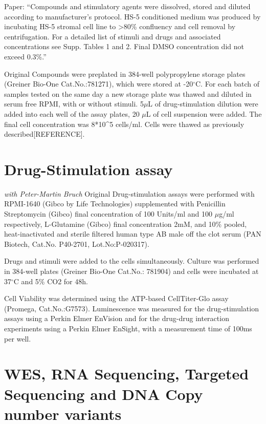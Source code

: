 \documentclass[11pt, a4paper, twosided]{book}
\begin{document}
Paper:
``Compounds and stimulatory agents were dissolved, stored and diluted according to manufacturer's protocol. HS-5 conditioned medium was produced by incubating HS-5 stromal cell line to \textgreater80\% confluency and cell removal by centrifugation. For a detailed list of stimuli and drugs and associated concentrations see Supp. Tables 1 and 2. Final DMSO concentration did not exceed 0.3\%.''

Original
Compounds were preplated in 384-well polypropylene storage plates (Greiner Bio-One Cat.No.:781271), which were stored at -20\(^\circ\)C. For each batch of samples tested on the same day a new storage plate was thawed and diluted in serum free RPMI, with or without stimuli. 5\(\mu\)L of drug-stimulation dilution were added into each well of the assay plates, 20 \(\mu\)L of cell suspension were added. The final cell concentration was 8*10\^{}5 cells/ml. Cells were thawed as previously described{[}REFERENCE{]}.

\hypertarget{drug-stimulation-assay}{%
\chapter{Drug-Stimulation assay}\label{drug-stimulation-assay}}

\emph{with Peter-Martin Bruch} Original
Drug-stimulation assays were performed with RPMI-1640 (Gibco by Life Technologies) supplemented with Penicillin Streptomycin (Gibco) final concentration of 100 Units/ml and 100 \(\mu\)g/ml respectively, L-Glutamine (Gibco) final concentration 2mM, and 10\% pooled, heat-inactivated and sterile filtered human type AB male off the clot serum (PAN Biotech, Cat.No. P40-2701, Lot.No:P-020317).

Drugs and stimuli were added to the cells simultaneously. Culture was performed in 384-well plates (Greiner Bio-One Cat.No.: 781904) and cells were incubated at 37\(^\circ\)C and 5\% CO2 for 48h.

Cell Viability was determined using the ATP-based CellTiter-Glo assay (Promega, Cat.No.:G7573). Luminescence was measured for the drug-stimulation assays using a Perkin Elmer EnVision and for the drug-drug interaction experiments using a Perkin Elmer EnSight, with a measurement time of 100ms per well.

\hypertarget{wes-rna-sequencing-targeted-sequencing-and-dna-copy-number-variants}{%
\chapter{WES, RNA Sequencing, Targeted Sequencing and DNA Copy number variants}\label{wes-rna-sequencing-targeted-sequencing-and-dna-copy-number-variants}}
\end{document}
